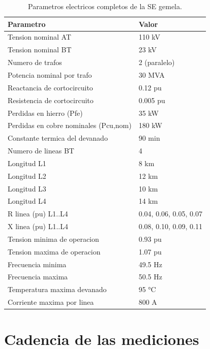 \begin{table}[ht]
\centering
\small
\caption{Parametros electricos completos de la SE gemela.}
\label{tab:param-completa}
\begin{tabular}{ll}
\toprule
\textbf{Parametro} & \textbf{Valor} \\
\midrule
Tension nominal AT  & 110 kV \\
Tension nominal BT  & 23 kV \\
Numero de trafos     & 2 (paralelo) \\
Potencia nominal por trafo & 30 MVA \\
Reactancia de cortocircuito & 0.12 pu \\
Resistencia de cortocircuito & 0.005 pu \\
Perdidas en hierro (Pfe) & 35 kW \\
Perdidas en cobre nominales (Pcu,nom) & 180 kW \\
Constante termica del devanado & 90 min \\
Numero de lineas BT & 4 \\
Longitud L1 & 8 km \\
Longitud L2 & 12 km \\
Longitud L3 & 10 km \\
Longitud L4 & 14 km \\
R linea (pu) L1..L4 & 0.04, 0.06, 0.05, 0.07 \\
X linea (pu) L1..L4 & 0.08, 0.10, 0.09, 0.11 \\
Tension minima de operacion & 0.93 pu \\
Tension maxima de operacion & 1.07 pu \\
Frecuencia minima & 49.5 Hz \\
Frecuencia maxima & 50.5 Hz \\
Temperatura maxima devanado & 95 \si{\degree}C} \\
Corriente maxima por linea & 800 A \\
\bottomrule
\end{tabular}
\end{table}

\section{Cadencia de las mediciones}


